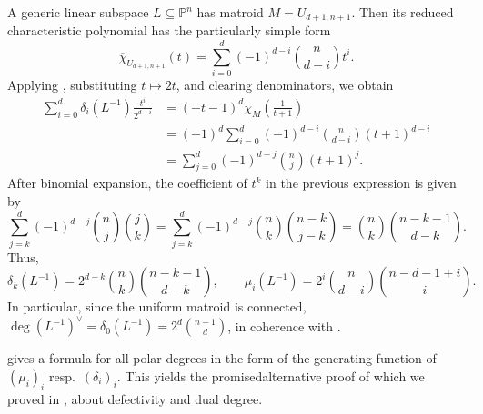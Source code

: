 \documentclass[12pt,a4paper,english]{scrartcl}
\newcommand{\PP}{\mathbb{P}}
\begin{document}
\begin{example}
\label{ex:uniform}
A generic linear subspace $L\subseteq \PP^n$ has matroid $M = U_{d+1,n+1}$. Then its reduced characteristic polynomial has the particularly simple form
\[
\overline{\chi}_{U_{d+1,n+1}}(t) = \sum_{i=0}^d (-1)^{d-i}\binom{n}{d-i} t^i.
\]
Applying , substituting $t\mapsto 2t$, and clearing denominators, we obtain
\begin{align*}
\sum_{i=0}^d \delta_i(L^{-1})\frac{t^i}{2^{d-i}} &= (-t-1)^d \overline{\chi}_M\left(\frac{1}{t+1}\right) \\
&= (-1)^d\sum_{i=0}^d (-1)^{d-i} \binom{n}{d-i} (t+1)^{d-i} \\
&= \sum_{j=0}^d (-1)^{d-j} \binom{n}{j}(t+1)^j.
\end{align*}
After binomial expansion, the coefficient of $t^k$ in the previous expression is given by
\[
\sum_{j=k}^d (-1)^{d-j} \binom{n}{j} \binom{j}{k} = \sum_{j=k}^d (-1)^{d-j} \binom{n}{k} \binom{n-k}{j-k} = \binom{n}{k} \binom{n-k-1}{d-k}.
\]
Thus,
\[
\delta_k(L^{-1}) = 2^{d-k} \binom{n}{k} \binom{n-k-1}{d-k}, \qquad \mu_i(L^{-1}) = 2^i \binom{n}{d-i} \binom{n-d-1+i}{i}.
\]
In particular, since the uniform matroid is connected, $\deg (L^{-1})^\vee = \delta_0(L^{-1}) = 2^d \binom{n-1}{d}$, in coherence with \cite[Theorem 4.11]{MatsubaraHeoTelen2026}.
\end{example}

 gives a formula for all polar degrees in the form of the generating function of $(\mu_i)_i$ resp.\ $(\delta_i)_i$. This yields the promisedalternative proof of  which we proved in , about defectivity and dual degree.
\end{document}
